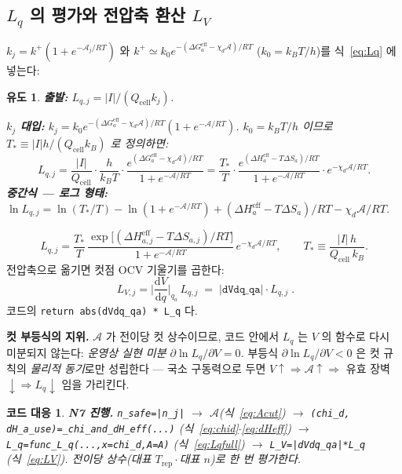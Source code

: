 \documentclass[11pt,a4paper]{article}
\newtheorem*{codebox}{코드 대응}
\newtheorem*{derivebox}{유도}
\newcommand{\dd}{\mathrm{d}}
\newcommand{\eff}{\mathrm{eff}}
\newcommand{\cell}{\mathrm{cell}}
\newcommand{\rep}{\mathrm{rep}}
\newcommand{\code}[1]{\texttt{#1}}
\begin{document}
\subsection{$L_q$ 의 평가와 전압축 환산 $L_V$}
$k_j=k^+(1+e^{-\mathcal A_j/RT})$ 와 $k^+\simeq k_0 e^{-(\Delta G_a^\eff-\chi_d\mathcal A)/RT}$ ($k_0=k_BT/h$)를
식~\eqref{eq:Lq} 에 넣는다:

\begin{derivebox}
\textbf{출발:} $L_{q,j}=|I|/(Q_\cell k_j)$.

\textbf{$k_j$ 대입:} $k_j=k_0 e^{-(\Delta G_a^\eff-\chi_d\mathcal A)/RT}(1+e^{-\mathcal A/RT})$.
$k_0=k_BT/h$ 이므로 $T_*\equiv|I|h/(Q_\cell k_B)$ 로 정의하면:
\begin{equation*}
L_{q,j}=\frac{|I|}{Q_\cell}\cdot\frac{h}{k_BT}\cdot\frac{e^{(\Delta G_a^\eff-\chi_d\mathcal A)/RT}}{1+e^{-\mathcal A/RT}}
=\frac{T_*}{T}\cdot\frac{e^{(\Delta H_a^\eff-T\Delta S_a)/RT}}{1+e^{-\mathcal A/RT}}\cdot e^{-\chi_d\mathcal A/RT}.
\end{equation*}
\textbf{중간식 — 로그 형태:}
$\ln L_{q,j}=\ln(T_*/T)-\ln(1+e^{-\mathcal A/RT})+(\Delta H_a^\eff-T\Delta S_a)/RT-\chi_d\mathcal A/RT$.
\end{derivebox}

\begin{equation}
L_{q,j}=\frac{T_*}{T}\,\frac{\exp\!\big[(\Delta H_{a,j}^\eff-T\Delta S_{a,j})/RT\big]}{1+e^{-\mathcal A/RT}}
\,e^{-\chi_d\mathcal A/RT},
\qquad T_*\equiv\frac{|I|\,h}{Q_\cell\,k_B}.
\label{eq:Lqfull}
\end{equation}
전압축으로 옮기면 컷점 OCV 기울기를 곱한다:
\begin{equation}
\boxed{\;L_{V,j}=\Big|\frac{\dd V}{\dd q}\Big|_{q_a}\,L_{q,j}\;=\;|\code{dVdq\_qa}|\cdot L_{q,j}\;.}
\label{eq:LV}
\end{equation}
코드의 \code{return abs(dVdq\_qa) * L\_q} 다.

\textbf{컷 부등식의 지위.} $\mathcal A$ 가 전이당 컷 상수이므로, 코드 안에서 $L_q$ 는 $V$ 의 함수로 다시 미분되지 않는다:
\emph{운영상 실현 미분 $\partial\ln L_q/\partial V=0$.} 부등식 $\partial\ln L_q/\partial V<0$ 은 컷 규칙의 \emph{물리적 동기}로만 성립한다 — 국소 구동력으로 두면
$V\!\uparrow\Rightarrow\mathcal A\!\uparrow\Rightarrow$ 유효 장벽$\downarrow\Rightarrow L_q\downarrow$ 임을 가리킨다.

\begin{codebox}
\textbf{N7 진행.} \code{n\_safe=|n\_j|} $\to$ $\mathcal A$(식~\eqref{eq:Acut}) $\to$
\code{(chi\_d, dH\_a\_use)=\_chi\_and\_dH\_eff(...)} (식~\eqref{eq:chid}$\cdot$\eqref{eq:dHeff}) $\to$
\code{L\_q=func\_L\_q(...,x=chi\_d,A=A)} (식~\eqref{eq:Lqfull}) $\to$ \code{L\_V=|dVdq\_qa|*L\_q} (식~\eqref{eq:LV}).
전이당 \emph{상수}(대표 $T_\rep\cdot$대표 $n$)로 한 번 평가한다.
\end{codebox}
\end{document}
